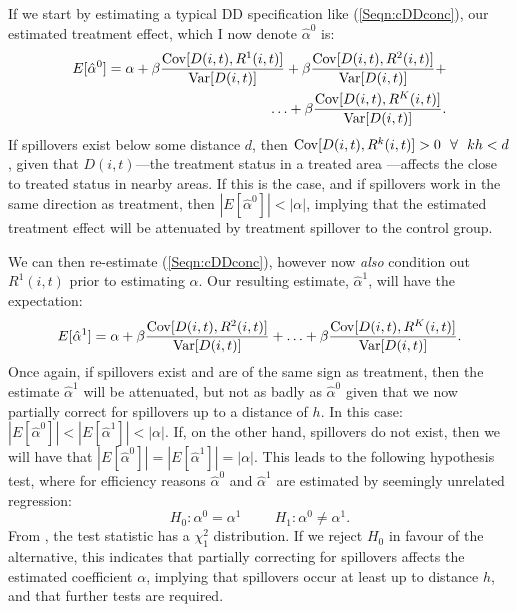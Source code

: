If we start by estimating a typical DD specification like (\ref{Seqn:cDDconc}),
our estimated treatment effect, which I now denote $\hat\alpha^0$ is:
\begin{equation}
\nonumber
\begin{split}
E[\hat\alpha^0]=\alpha + \beta\frac{\mathrm{Cov}[D(i,t),R^1(i,t)]}{\mathrm{Var}[D(i,t)]}
                       + \beta\frac{\mathrm{Cov}[D(i,t),R^2(i,t)]}{\mathrm{Var}[D(i,t)]}
                       + \\ \ldots
                       + \beta\frac{\mathrm{Cov}[D(i,t),R^K(i,t)]}{\mathrm{Var}[D(i,t)]}.
\end{split}
\end{equation}
If spillovers exist below some distance $d$, then $\Cov[D(i,t),R^k(i,t)]>0 \ \ 
\forall \ \ kh<d$, given that $D(i,t)$---the treatment status in a treated area%
---affects the close to treated status in nearby areas. If this is the case, and 
if spillovers work in the same direction as treatment, then 
$|E[\hat\alpha^0]|<|\alpha|$, implying that the estimated treatment 
effect will be attenuated by treatment spillover to the control group.  

We can then re-estimate (\ref{Seqn:cDDconc}), however now \emph{also} condition
out $R^1(i,t)$ prior to estimating $\alpha$.  Our resulting estimate, 
$\hat\alpha^1$, will have the expectation:
\begin{equation}
\nonumber
\begin{split}
E[\hat\alpha^1]=\alpha + \beta\frac{\mathrm{Cov}[D(i,t),R^2(i,t)]}{\mathrm{Var}[D(i,t)]}
                       + \ldots
                       + \beta\frac{\mathrm{Cov}[D(i,t),R^K(i,t)]}{\mathrm{Var}[D(i,t)]}.
\end{split}
\end{equation}
Once again, if spillovers exist and are of the same sign as treatment, then the
estimate $\hat\alpha^1$ will be attenuated, but not as badly as $\hat\alpha^0$ 
given that we now partially correct for spillovers up to a distance of $h$.  In 
this case: $|E[\hat\alpha^0]|<|E[\hat\alpha^1]|<|\alpha|$.  If, on the other 
hand, spillovers do not exist, then we will have that 
$|E[\hat\alpha^0]|=|E[\hat\alpha^1]|=|\alpha|$.  This leads to 
the following hypothesis test, where for efficiency reasons $\hat\alpha^0$
and $\hat\alpha^1$ are estimated by seemingly unrelated regression:
\[
H_0: \alpha^0=\alpha^1 \hspace{1cm}
H_1: \alpha^0\neq\alpha^1.
\]
From \citet{Zellner1962}, the test statistic has a $\chi^2_1$ distribution. If 
we reject $H_0$ in favour of the alternative, this indicates that partially 
correcting for spillovers affects the estimated coefficient $\alpha$, implying 
that spillovers occur at least up to distance $h$, and that further tests are 
required.  

